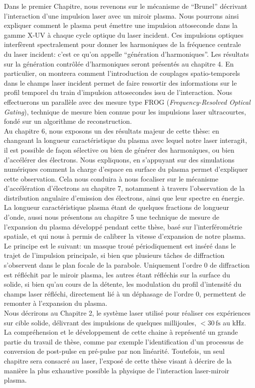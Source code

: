 \noindent Dans le premier Chapitre, nous revenons sur le mécanisme de ``Brunel'' décrivant l'interaction d'une impulsion laser avec un miroir plasma. Nous pourrons ainsi expliquer comment le plasma peut émettre une impulsion attoseconde dans la gamme X-UV à chaque cycle optique du laser incident. Ces impulsions optiques interfèrent spectralement pour donner les harmoniques de la fréquence centrale du laser incident: c'est ce qu'on appelle ``génération d'harmoniques''. Les résultats sur la génération contrôlée d'harmoniques seront présentés au chapitre 4. En particulier, on montrera comment l'introduction de couplages spatio-temporels dans le champs laser incident permet de faire ressortir des informations sur le profil temporel du train d'impulsion attosecondes issu de l'interaction. Nous effectuerons un parallèle avec des mesure type FROG (\textit{Frequency-Resolved Optical Gating}), technique de mesure bien connue pour les impulsions laser ultracourtes, fondé sur un algorithme de reconstruction. \\

\noindent Au chapitre 6, nous exposons un des résultats majeur de cette thèse: en changeant la longueur caractéristique du plasma avec lequel notre laser interagit, il est possible de façon sélective ou bien de générer des harmoniques, ou bien d'accélérer des électrons. Nous expliquons, en s'appuyant sur des simulations numériques comment la charge d'espace en surface du plasma permet d'expliquer cette observation. Cela nous conduira à nous focaliser sur le mécanisme d'accélération d'électrons au chapitre 7, notamment à travers l'observation de la distribution angulaire d'emission des électrons, ainsi que leur spectre en énergie. \\

\noindent La longueur caractéristique plasma étant de quelques fractions de longueur d'onde, aussi nous présentons au chapitre 5 une technique de mesure de l'expansion du plasma développé pendant cette thèse, basé sur l'interférométrie spatiale, et qui nous à permis de calibrer la vitesse d'expansion de notre plasma. Le principe est le suivant: un masque troué périodiquement est inséré dans le trajet de l'impulsion principale, si bien que plusieurs tâches de diffraction s'observent dans le plan focale de la parabole. Uniquement l'ordre 0 de diffraction est réfléchit par le miroir plasma, les autres étant réfléchis sur la surface du solide, si bien qu'au cours de la détente, les modulation du profil d'intensité du champs laser réfléchi, directement lié à un déphasage de l'ordre 0, permettent de remonter à l'expansion du plasma.\\

\noindent Nous décrirons au Chapitre 2, le système laser utilisé pour réaliser ces expériences sur cible solide, délivrant des impulsions de quelques millijoules, $<30\,\mathrm{fs}$ au kHz. La compréhension et le développement de cette chaine à représenté un grande partie du travail de thèse, comme par exemple l'identification d'un processus de conversion de post-pulse en pré-pulse par non linéarité. Toutefois, un seul chapitre sera consacré au laser, l'exposé de cette thèse visant à décrire de la manière la plus exhaustive possible la physique de l'interaction laser-miroir plasma.